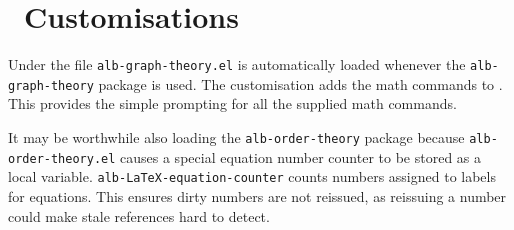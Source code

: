 \documentclass[11pt,a4paper,oneside,titlepage]{alb-corp}
\begin{document}
\section{\AUCTeX\ Customisations}
\label{sec:alb-graph-theory-documentation:auctex-cust}

Under \AUCTeX{} the file \texttt{alb-graph-theory.el} is automatically
loaded whenever the \texttt{alb-graph-theory} package is used.  The
customisation adds the math commands to \AUCTeX{}.  This provides the
simple prompting for all the supplied math commands.

It may be worthwhile also loading the \texttt{alb-order-theory} package
because \texttt{alb-order-theory.el} causes a special equation number
counter to be stored as a local variable.
\texttt{alb-LaTeX-equation-counter} counts numbers assigned to labels
for equations.  This ensures dirty numbers are not reissued, as
reissuing a number could make stale references hard to detect.
\end{document}
